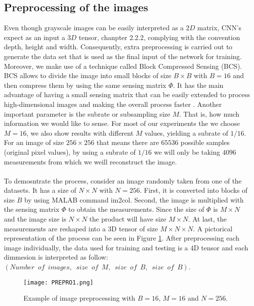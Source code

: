 \subsection{Preprocessing of the images} \label{sec:prepro}
Even though grayscale images can be easily interpreted as a $2D$ matrix, CNN's expect as an input a $3D$ tensor, chanpter 2.2.2, complying with the convention depth, height and width. Consequently, extra preprocessing is carried out to generate the data set that is used as the final input of the network for training. Moreover, we make use of a technique called Block Compressed Sensing (BCS). BCS allows to divide the image into small blocks of size $B \times B$ with $B=16$ and then compress them by using the same sensing matrix $\Phi$. It has the main advantage of having a small sensing matrix that can be easily extended to process high-dimensional images and making the overall process faster \cite{gan2007block, fowler2012block}. Another important parameter is the subrate or subsampling size $M$. That is, how much information we would like to sense. For most of our experiments the we choose $M=16$, we also show results with different $M$ values, yielding a subrate of $1/16$. For an image of size $256 \times 256$ that means there are $65536$ possible samples (original pixel values), by using a subrate of $1/16$ we will only be taking $4096$ measurements from which we weill reconstruct the image.          \
\\\\
To demosntrate the process, consider an image randomly taken from one of the datasets. It has a size of $N \times N$ with $N=256$. First, it is converted into  blocks of size $B$ by using MALAB command im2col. Second, the image is multiplied with the sensing matrix $\Phi$ to obtain the measurements. Since the size of $\Phi$ is $M \times N $ and the image size is $N \times N$ the product will have size $M \times N$. At last, the measurements are reshaped into a 3D tensor of size $M \times N \times N$. A pictorical representation of the process can be seen in Figure \ref{fig:PREPROim1}. After preprocessing each image individually, the data used for training and testing is a 4D tensor and each dimmesion is interpreted as follow: $(Number \enspace of \enspace images, \enspace size \enspace of \enspace M ,\enspace size \enspace of \enspace B , \enspace size \enspace of \enspace B)$.  
\begin{figure}[tb] 
\centering 
\texttt{[image: PREPRO1.png]} 
\caption[Preprocessing of images]{Example of image preprocessing  with $B=16$, $M=16$ and $N=256$.}
\label{fig:PREPROim1} 
\end{figure}


